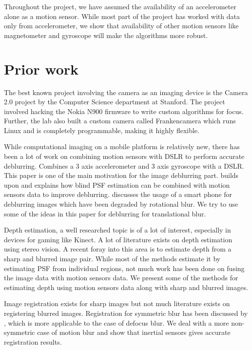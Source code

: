 \documentclass[BTech]{iitmdiss}
\begin{document}
Throughout the project, we have assumed the availability of an accelerometer
alone as a motion sensor. While most part of the project has worked with data only from accelerometer, we show that availability of other motion sensors
like magnetometer and gyroscope will make the algorithms more robust.

\section{Prior work}
\label{intro:prior_work}
The best known project involving the camera as an imaging device is the 
Camera 2.0 project by the Computer Science department at Stanford. The
project involved hacking the Nokia N900 firmware to write custom algorithms
for focus. Further, the lab also built a custom camera called Frankencamera
which runs Linux and is completely programmable, making it highly flexible.

While computational imaging on a mobile platform is relatively new, there
has been a lot of work on combining motion sensors with DSLR to perform
accurate deblurring. \citet{joshi2010image} Combines a 3 axis accelerometer
and 3 axis gyroscope with a DSLR. This paper is one of the main motivation
for the image deblurring part. \citet{bae2013accurate} builds upon
\citet{joshi2010image} and explains how blind PSF estimation can be
combined with motion sensors data to improve deblurring. \citet{vsindelavr2013image} discusses the usage of a smart phone for deblurring
images which have been degraded by rotational blur. We try to use some
of the ideas in this paper for deblurring for translational blur.

Depth estimation, a well researched topic is of a lot of interest, 
especially in devices for gaming like Kinect. A lot of literature exists
on depth estimation using stereo vision. A recent foray into this area
is to estimate depth from a sharp and blurred image pair. While most of 
the methods estimate it by estimating PSF from individual regions, not
much work has been done on fusing the image data with motion sensors 
data. We present some of the methods for estimating depth using motion
sensors data along with sharp and blurred images. 

Image registration exists for sharp images but not much literature exists
on registering blurred images. Registration for symmetric blur
has been discussed by \citet{ojansivu2007image}, which is more applicable
to the case of defocus blur. We deal with a more non-symmetric case of
motion blur and show that inertial sensors gives accurate registration 
results.
\end{document}
